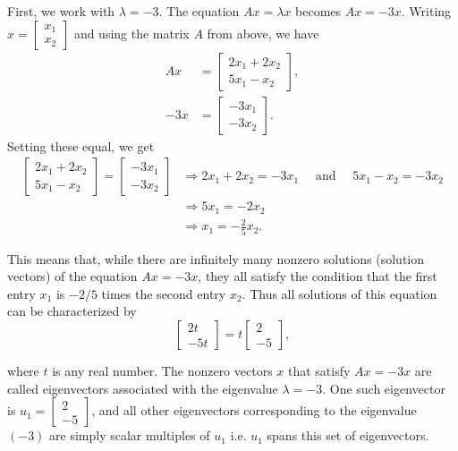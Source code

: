 \begin{example}
First, we work with \( \lambda = -3 \). The equation \( Ax = \lambda x \) becomes \( Ax = -3x \). Writing \( x = \begin{bmatrix} x_1 \\ x_2 \end{bmatrix} \) and using the matrix \( A \) from above, we have 
\[
\begin{aligned}
    Ax &= \begin{bmatrix} 2x_1 + 2x_2 \\ 5x_1 - x_2 \end{bmatrix}, \\
    -3x &= \begin{bmatrix} -3x_1 \\ -3x_2 \end{bmatrix}.
\end{aligned}
\]
Setting these equal, we get
$$
\begin{aligned}
{\left[\begin{array}{c}
2 x_1+2 x_2 \\
5 x_1-x_2
\end{array}\right]=\left[\begin{array}{c}
-3 x_1 \\
-3 x_2
\end{array}\right] } & \Rightarrow 2 x_1+2 x_2=-3 x_1 \quad \text { and } \quad 5 x_1-x_2=-3 x_2 \\
& \Rightarrow 5 x_1=-2 x_2 \\
& \Rightarrow x_1=-\frac{2}{5} x_2 .
\end{aligned}
$$

This means that, while there are infinitely many nonzero solutions (solution vectors) of the equation ${A x}=-3 {x}$, they all satisfy the condition that the first entry $x_1$ is $-2 / 5$ times the second entry $x_2$. Thus all solutions of this equation can be characterized by
$$
\left[\begin{array}{c}
2 t \\
-5 t
\end{array}\right]=t\left[\begin{array}{c}
2 \\
-5
\end{array}\right],
$$

 where \( t \) is any real number. The nonzero vectors \( x \) that satisfy \( Ax = -3x \) are called eigenvectors associated with the eigenvalue \( \lambda = -3 \). One such eigenvector is \( u_1 = \begin{bmatrix} 2 \\ -5 \end{bmatrix} \), and all other eigenvectors corresponding to the eigenvalue \((-3)\) are simply scalar multiples of \( u_1 \) i.e. \( u_1 \) spans this set of eigenvectors.


\end{example}

